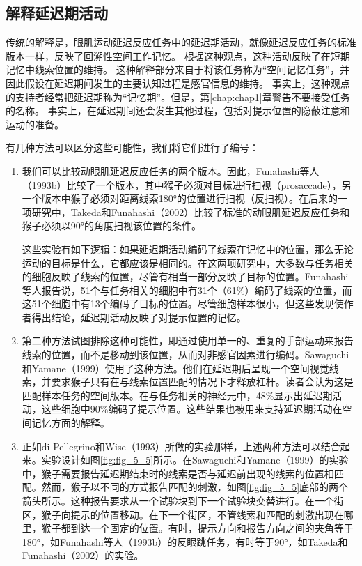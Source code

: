 \subsection{解释延迟期活动}

传统的解释是，眼肌运动延迟反应任务中的延迟期活动，就像延迟反应任务的标准版本一样，反映了回溯性空间工作记忆。
根据这种观点，这种活动反映了在短期记忆中线索位置的维持。
这种解释部分来自于将该任务称为“空间记忆任务”，并因此假设在延迟期间发生的主要认知过程是感官信息的维持。
事实上，这种观点的支持者经常把延迟期称为“记忆期”。但是，第\ref{chap:chap1}章警告不要接受任务的名称。
事实上，在延迟期间还会发生其他过程，包括对提示位置的隐蔽注意和运动的准备。


有几种方法可以区分这些可能性，我们将它们进行了编号：


\begin{enumerate}
	\item 我们可以比较动眼肌延迟反应任务的两个版本。因此，Funahashi等人（1993b）比较了一个版本，其中猴子必须对目标进行扫视（prosaccade），另一个版本中猴子必须对距离线索180°的位置进行扫视（反扫视）。在后来的一项研究中，Takeda和Funahashi（2002）比较了标准的动眼肌延迟反应任务和猴子必须以90°的角度扫视该位置的条件。
	
	这些实验有如下逻辑：如果延迟期活动编码了线索在记忆中的位置，那么无论运动的目标是什么，它都应该是相同的。在这两项研究中，大多数与任务相关的细胞反映了线索的位置，尽管有相当一部分反映了目标的位置。Funahashi等人报告说，51个与任务相关的细胞中有31个（61\%）编码了线索的位置，而这51个细胞中有13个编码了目标的位置。尽管细胞样本很小，但这些发现使作者得出结论，延迟期活动反映了对提示位置的记忆。
	\item 第二种方法试图排除这种可能性，即通过使用单一的、重复的手部运动来报告线索的位置，而不是移动到该位置，从而对非感官因素进行编码。Sawaguchi和Yamane（1999）使用了这种方法。他们在延迟期后呈现一个空间视觉线索，并要求猴子只有在与线索位置匹配的情况下才释放杠杆。读者会认为这是匹配样本任务的空间版本。在与任务相关的神经元中，48\%显示出延迟期活动，这些细胞中90\%编码了提示位置。这些结果也被用来支持延迟期活动在空间记忆方面的解释。
	\item 正如di Pellegrino和Wise（1993）所做的实验那样，上述两种方法可以结合起来。实验设计如图\ref{fig:fig_5_5}所示。在Sawaguchi和Yamane（1999）的实验中，猴子需要报告延迟期结束时的线索是否与延迟前出现的线索的位置相匹配。然而，猴子以不同的方式报告匹配的刺激，如图\ref{fig:fig_5_5}底部的两个箭头所示。这种报告要求从一个试验块到下一个试验块交替进行。在一个街区，猴子向提示的位置移动。在下一个街区，不管线索和匹配的刺激出现在哪里，猴子都到达一个固定的位置。有时，提示方向和报告方向之间的夹角等于180°，如Funahashi等人（1993b）的反眼跳任务，有时等于90°，如Takeda和Funahashi（2002）的实验。
	

\end{enumerate}
